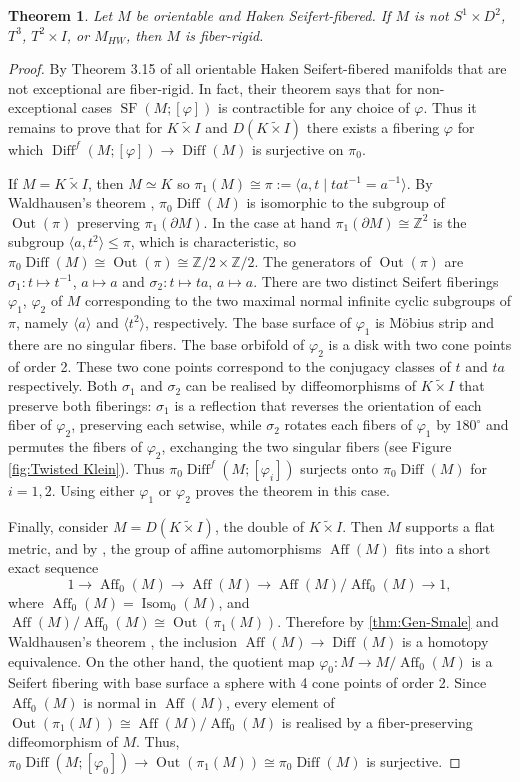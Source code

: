 \documentclass{amsart}
\theoremstyle{plain}
\newtheorem{thm}{Theorem}[section]
\theoremstyle{definition}
\DeclareMathOperator\Diff{Diff}
\DeclareMathOperator\Isom{Isom}
\DeclareMathOperator\Aff{Aff}
\DeclareMathOperator{\Out}{Out}
\DeclareMathOperator{\SF}{SF}
\newcommand{\bbZ}{\mathbb{Z}}
\newcommand{\Z}{\mathbb{Z}}
\newcommand{\Kx}{K\widetilde{\times}I}
\begin{document}
\begin{thm}\label{thm:Unique-fibering}
    Let $M$ be orientable and Haken Seifert-fibered. If $M$ is not $S^1 \times D^2$, $T^3$, $T^2\times I$, or $M_{HW}$, then $M$ is fiber-rigid.
\end{thm}
\begin{proof} 
    By Theorem 3.15 of \cite{HKMR12} all orientable Haken Seifert-fibered manifolds that are not exceptional are fiber-rigid.
    In fact, their theorem says that for non-exceptional cases $\SF(M;[\varphi])$ is contractible for any choice of $\varphi$.
    Thus it remains to prove that for $\Kx$ and $D(\Kx)$ there exists a fibering $\varphi$ for which $\Diff^f(M; [\varphi]) \to \Diff(M)$ is surjective on $\pi_0$.
    
If $M=\Kx$, then $M\simeq K$ so $\pi_1(M)\cong \pi :=\langle a,t\mid tat^{-1}=a^{-1}\rangle$. 
By Waldhausen's theorem \cite{Waldhausen68}, $\pi_0\Diff(M)$ is isomorphic to the subgroup of $\Out(\pi)$ preserving $\pi_1(\partial M)$.
In the case at hand $\pi_1(\partial M) \cong \bbZ^2$ 
is the subgroup $\langle a, t^2\rangle \leq \pi$, which is characteristic, so $\pi_0\Diff(M)\cong \Out(\pi)\cong \Z/2\times\Z/2$. 
The generators of $\Out(\pi)$ are $\sigma_1\colon t\mapsto t^{-1}$, $a\mapsto a$ and $\sigma_2\colon t\mapsto ta$, $a\mapsto a$.
There are two distinct Seifert fiberings $\varphi_1$, $\varphi_2$ of $M$ corresponding to the two maximal normal infinite cyclic subgroups of $\pi$, namely $\langle a\rangle$ and $\langle t^2\rangle$, respectively. 
The base surface of $\varphi_1$ is M\"obius strip and there are no singular fibers. 
The base orbifold of $\varphi_2$ is a disk with two cone points of order 2. 
These two cone points correspond to the conjugacy classes of $t$ and $ta$ respectively. 
Both $\sigma_1$ and $\sigma_2$ can be realised by diffeomorphisms of $\Kx$ that preserve both fiberings: $\sigma_1$ is a reflection that reverses the orientation of each fiber of $\varphi_2$, preserving each setwise, while $\sigma_2$ rotates each fibers of $\varphi_1$ by $180^\circ$ and permutes the fibers of $\varphi_2$, exchanging the two singular fibers (see Figure \ref{fig:Twisted Klein}). Thus $\pi_0\Diff^f(M;[\varphi_i])$ surjects onto $\pi_0\Diff(M)$ for $i=1,2$. Using either $\varphi_1$ or $\varphi_2$ proves the theorem in this case.


Finally, consider $M=D(\Kx)$, the double of $\Kx$.  Then $M$ supports a flat metric, and by \cite[Theorem 1]{CharlapVasquez}, the group of affine automorphisms $\Aff(M)$ fits into a short exact sequence\[1\rightarrow \Aff_0(M)\rightarrow \Aff(M)\rightarrow \Aff(M)/\Aff_0(M)\rightarrow 1,\] where $\Aff_0(M)= \Isom_0(M)$, and $\Aff(M)/\Aff_0(M)\cong \Out(\pi_1(M))$.  Therefore by \cref{thm:Gen-Smale} and Waldhausen's theorem \cite{Waldhausen68}, the inclusion $\Aff(M)\rightarrow \Diff(M)$ is a homotopy equivalence.
On the other hand, the quotient map  $\varphi_0\colon M\rightarrow M/\Aff_0(M)$ is a Seifert fibering with base surface a sphere with 4 cone points of order 2. Since $\Aff_0(M)$ is normal in $\Aff(M)$, every element of $\Out(\pi_1(M))\cong \Aff(M)/\Aff_0(M)$ is realised by a fiber-preserving diffeomorphism of $M$. Thus, $\pi_0\Diff(M;[\varphi_0])\rightarrow \Out(\pi_1(M))\cong \pi_0\Diff(M)$ is surjective. \end{proof}
\end{document}
